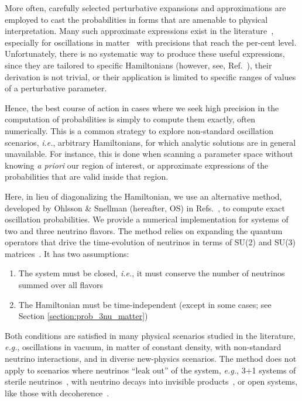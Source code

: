 \documentclass[final,5p,times,twocolumn]{elsarticle}
\newcommand{\ie}{{\it i.e.}}
\newcommand{\eg}{{\it e.g.}}
\newcommand{\Ref}{Ref.}
\newcommand{\Refs}{Refs.}
\begin{document}
More often, carefully selected perturbative expansions and approximations are employed to cast the probabilities in forms that are amenable to physical interpretation.  Many such approximate expressions exist in the literature\ \cite{Gago:2002na, Blennow:2008eb, Diaz:2009qk, Meloni:2009ia, Chaves:2018sih}, especially for oscillations in matter\ \cite{Petcov:1986qg, Hirota:1998wv, Cervera:2000kp, Freund:2001pn, Akhmedov:2004ny, Friedland:2006pi, Ioannisian:2008ve, Supanitsky:2008eq, Minakata:2015gra, Flores:2015mah, Li:2016pzm, Denton:2016wmg, Parke:2019vbs} with precisions that reach the per-cent level.  Unfortunately, there is no systematic way to produce these useful expressions, since they are tailored to specific Hamiltonians (however, see, \Ref\ \cite{Denton:2018fex}), their derivation is not trivial, or their application is limited to specific ranges of values of a perturbative parameter.  

Hence, the best course of action in cases where we seek high precision in the computation of probabilities is simply to compute them exactly, often numerically.  This is a common strategy to explore non-standard oscillation scenarios, \ie, arbitrary Hamiltonians, for which analytic solutions are in general unavailable.  For instance, this is done when scanning a parameter space without knowing {\it a priori} our region of interest, or approximate expressions of the probabilities that are valid inside that region.   

Here, in lieu of diagonalizing the Hamiltonian, we use an alternative method, developed by Ohlsson \& Snellman (hereafter, OS) in \Refs\ \cite{Ohlsson:1999xb, Ohlsson:1999um, Ohlsson:2000zz, Ohlsson:2001et}, to compute exact oscillation probabilities.  We provide a numerical implementation for systems of two and three neutrino flavors.  The method relies on expanding the quantum operators that drive the time-evolution of neutrinos in terms of SU(2) and SU(3) matrices\ \cite{Ohlsson:1999xb, Ohlsson:1999um, Ohlsson:2000zz, Ohlsson:2001et}.  It has two assumptions: 
\begin{enumerate}
 \item 
  The system must be closed, \ie, it must conserve the number of neutrinos summed over all flavors
 \item
  The Hamiltonian must be time-independent (except in some cases; see Section \ref{section:prob_3nu_matter})
\end{enumerate}
Both conditions are satisfied in many physical scenarios studied in the literature, \eg, oscillations in vacuum, in matter of constant density, with non-standard neutrino interactions, and in diverse new-physics scenarios.  The method does not apply to scenarios where neutrinos ``leak out'' of the system, \eg, 3+1 systems of sterile neutrinos\ \cite{Abazajian:2012ys, Palazzo:2013me, Gariazzo:2015rra, Dentler:2018sju, Giunti:2019aiy}, with neutrino decays into invisible products\ \cite{Joshipura:2002fb, Beacom:2002cb, Beacom:2002vi, GonzalezGarcia:2008ru, Baerwald:2012kc, Berryman:2014yoa}, or open systems, like those with decoherence\ \cite{Benatti:2000ph, Lisi:2000zt, Ohlsson:2000mj, Carpio:2017nui, Coloma:2018idr}.
\end{document}
